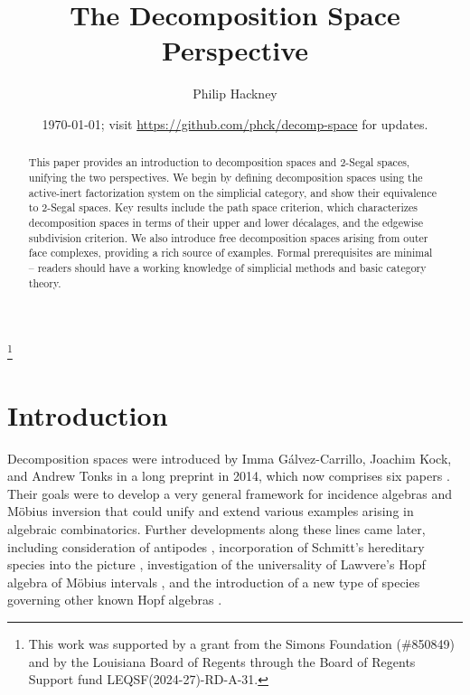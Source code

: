 \documentclass{conm-p-l}
\theoremstyle{definition}
\theoremstyle{remark}
\begin{document}
\title{The Decomposition Space Perspective}
\author{Philip Hackney}
\address{Department of Mathematics, University of Louisiana at Lafayette}
\thanks{This work was supported by a grant from the Simons Foundation (\#850849) and by the Louisiana Board of Regents through the Board of Regents Support fund LEQSF(2024-27)-RD-A-31.}

\date{\today; visit \url{https://github.com/phck/decomp-space} for updates.}



\begin{abstract}
This paper provides an introduction to decomposition spaces and 2-Segal spaces, unifying the two perspectives.
We begin by defining decomposition spaces using the active-inert factorization system on the simplicial category, and show their equivalence to 2-Segal spaces. 
Key results include the path space criterion, which characterizes decomposition spaces in terms of their upper and lower décalages, and the edgewise subdivision criterion. 
We also introduce free decomposition spaces arising from outer face complexes, providing a rich source of examples. 
Formal prerequisites are minimal -- readers should have a working knowledge of simplicial methods and basic category theory.
\end{abstract}

\maketitle

\section{Introduction}

Decomposition spaces were introduced by Imma G\'alvez-Carrillo, Joachim Kock, and Andrew Tonks in a long preprint in 2014, which now comprises six papers \cite{GKT1,GKT2,GKT3,GKT:DSC,GKT:DSRS,GKT:HLA}.
Their goals were to develop a very general framework for incidence algebras and Möbius inversion that could unify and extend various examples arising in algebraic combinatorics.
Further developments along these lines came later, including consideration of antipodes \cite{CarlierKock:AMDS}, incorporation of Schmitt's hereditary species into the picture \cite{Carlier:HSMDS}, investigation of the universality of Lawvere's Hopf algebra of M\"obius intervals \cite{Forero:GCKTCLDDS}, and the introduction of a new type of species governing other known Hopf algebras \cite{CebrianForero:DHSDS}.
\end{document}
